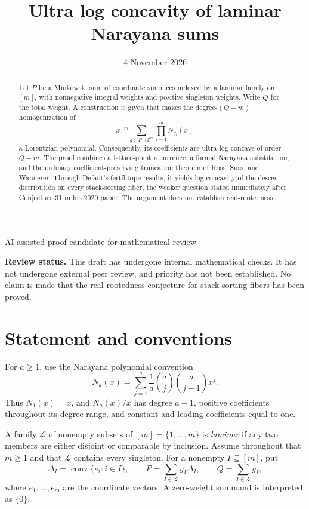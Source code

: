 \documentclass[11pt,letterpaper]{article}
\title{\vspace{-1.2em}\LARGE\bfseries Ultra log concavity of laminar Narayana sums}
\author{}
\date{\normalsize 4 November 2026}
\theoremstyle{definition}
\theoremstyle{remark}
\newcommand{\ZZ}{\mathbb{Z}}
\newcommand{\cL}{\mathcal{L}}
\newcommand{\conv}{\operatorname{conv}}
\begin{document}
\maketitle
\vspace{-2em}
\begin{center}\small AI-assisted proof candidate for mathematical review\end{center}
\vspace{-0.5em}
\noindent\textbf{Review status.} This draft has undergone internal mathematical checks. It has not undergone external peer review, and priority has not been established. No claim is made that the real-rootedness conjecture for stack-sorting fibers has been proved.

\begin{abstract}
Let $P$ be a Minkowski sum of coordinate simplices indexed by a laminar family on $[m]$, with nonnegative integral weights and positive singleton weights. Write $Q$ for the total weight. A construction is given that makes the degree-$(Q-m)$ homogenization of
\[
 x^{-m}\sum_{q\in P\cap\ZZ^m}\prod_{i=1}^m N_{q_i}(x)
\]
a Lorentzian polynomial. Consequently, its coefficients are ultra log-concave of order $Q-m$. The proof combines a lattice-point recurrence, a formal Narayana substitution, and the ordinary coefficient-preserving truncation theorem of Ross, S\"uss, and Wannerer. Through Defant's fertilitope results, it yields log-concavity of the descent distribution on every stack-sorting fiber, the weaker question stated immediately after Conjecture 31 in his 2020 paper. The argument does not establish real-rootedness.
\end{abstract}

\section{Statement and conventions}
For $a\geq1$, use the Narayana polynomial convention
\begin{equation}\label{eq:narayana}
 N_a(x)=\sum_{j=1}^{a}\frac1a\binom{a}{j}\binom{a}{j-1}x^j.
\end{equation}
Thus $N_1(x)=x$, and $N_a(x)/x$ has degree $a-1$, positive coefficients throughout its degree range, and constant and leading coefficients equal to one.

A family $\cL$ of nonempty subsets of $[m]=\{1,\ldots,m\}$ is \emph{laminar} if any two members are either disjoint or comparable by inclusion. Assume throughout that $m\geq1$ and that $\cL$ contains every singleton. For a nonempty $I\subseteq[m]$, put
\[
 \Delta_I=\conv\{e_i:i\in I\},\qquad
 P=\sum_{I\in\cL}y_I\Delta_I,
 \qquad Q=\sum_{I\in\cL}y_I,
\]
where $e_1,\ldots,e_m$ are the coordinate vectors. A zero-weight summand is interpreted as $\{0\}$.
\end{document}
